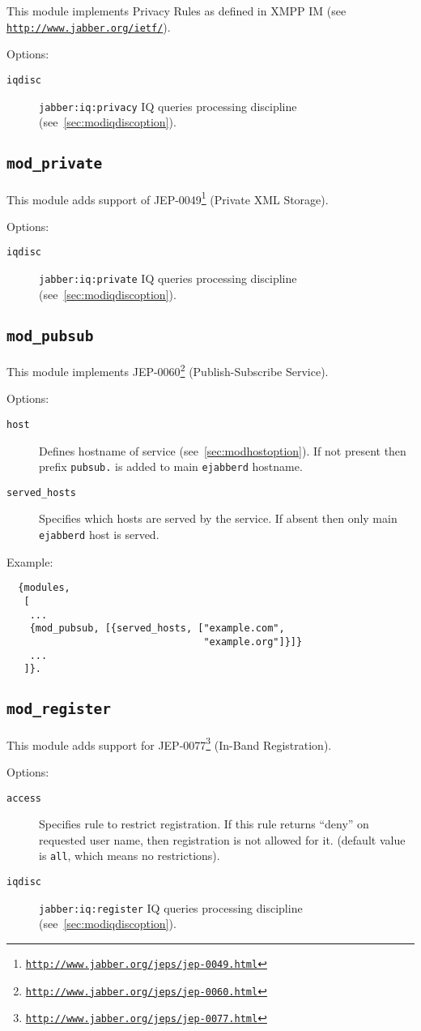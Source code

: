 \documentclass[a4paper,10pt]{article}
\newcommand{\bracehack}{\def\{{\char"7B}\def\}{\char"7D}}
\newcommand{\ns}[1]{\texttt{#1}}
\newcommand{\jid}[1]{\texttt{#1}}
\newcommand{\term}[1]{\texttt{#1}}
\newcommand{\ejabberd}{\texttt{ejabberd}}
\newcommand{\module}[1]{\texttt{#1}}
\newcommand{\modprivate}{\module{mod\_private}}
\newcommand{\modpubsub}{\module{mod\_pubsub}}
\newcommand{\modregister}{\module{mod\_register}}
\newcommand{\titem}[1]{\item[\bracehack\texttt{#1}]}
\gdef\ahrefurl#1{\href{#1}{\texttt{#1}}}
\gdef\footahref#1#2{#2\footnote{\href{#1}{\texttt{#1}}}}
\newcommand{\tjepref}[2]{\footahref{http://www.jabber.org/jeps/jep-#1.html}{#2}}
\newcommand{\jepref}[1]{\tjepref{#1}{JEP-#1}}
\newcommand{\iqdiscitem}[1]{\titem{iqdisc} #1 IQ queries processing
discipline (see~\ref{sec:modiqdiscoption}).}
\newcommand{\hostitem}[1]{\titem{host} Defines hostname of service
(see~\ref{sec:modhostoption}). If not present
then prefix \jid{#1.} is added to main \ejabberd{} hostname.}
\begin{document}
This module implements Privacy Rules as defined in XMPP IM
(see \ahrefurl{http://www.jabber.org/ietf/}).

Options:
\begin{description}
\iqdiscitem{\ns{jabber:iq:privacy}}
\end{description}


\subsection{\modprivate{}}
\label{sec:modprivate}

This module adds support of \jepref{0049} (Private XML Storage).

Options:
\begin{description}
\iqdiscitem{\ns{jabber:iq:private}}
\end{description}


\subsection{\modpubsub{}}
\label{sec:modpubsub}

This module implements \jepref{0060} (Publish-Subscribe Service).

Options:
\begin{description}
\hostitem{pubsub}
\titem{served\_hosts} Specifies which hosts are served by the service.
If absent then only main \ejabberd{} host is served.
\end{description}

Example:
\begin{verbatim}
  {modules,
   [
    ...
    {mod_pubsub, [{served_hosts, ["example.com",
                                  "example.org"]}]}
    ...
   ]}.
\end{verbatim}


\subsection{\modregister{}}
\label{sec:modregister}

This module adds support for \jepref{0077} (In-Band Registration).

Options:
\begin{description}
\titem{access} Specifies rule to restrict registration.
If this rule returns ``deny'' on requested user name, then
registration is not allowed for it. (default value is \term{all}, which means
no restrictions).
\iqdiscitem{\ns{jabber:iq:register}}
\end{description}
\end{document}
